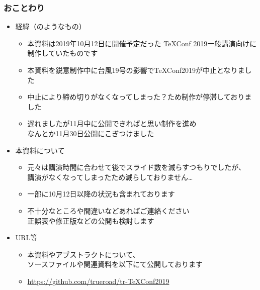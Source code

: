 \begin{frame}\frametitle{おことわり}
  \footnotesize
  \begin{itemize}
  \item 経緯（のようなもの）
    \begin{itemize}
      \tiny
    \item 本資料は2019年10月12日に開催予定だった
      \href{https://texconf2019.tumblr.com/}
           {TeXConf 2019}一般講演向けに制作していたものです
    \item 本資料を鋭意制作中に台風19号の影響でTeXConf2019が中止となりました
    \item 中止により締め切りがなくなってしまった？ため制作が停滞しておりました
    \item 遅れましたが11月中に公開できればと思い制作を進め \\
      なんとか11月30日公開にこぎつけました
    \end{itemize}
  \item 本資料について
    \begin{itemize}
      \tiny
    \item 元々は講演時間に合わせて後でスライド数を減らすつもりでしたが、 \\
      講演がなくなってしまったため減らしておりません…
    \item 一部に10月12日以降の状況も含まれております
    \item 不十分なところや間違いなどあればご連絡ください \\
      正誤表や修正版などの公開も検討します
    \end{itemize}
  \item URL等
    \begin{itemize}
      \tiny
    \item 本資料やアブストラクトについて、 \\
      ソースファイルや関連資料を以下にて公開しております
    \item \url{https://github.com/trueroad/tr-TeXConf2019}
    \end{itemize}
  \end{itemize}
\end{frame}

